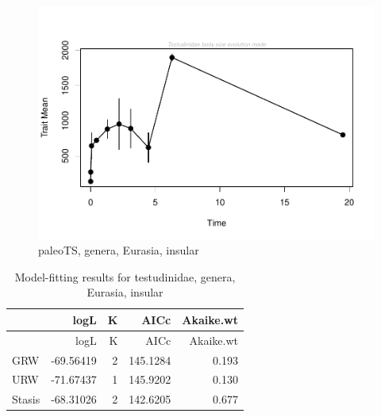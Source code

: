 \newpage

\begin{figure}[H]
	\centering
	\includegraphics{MA_JJ_files/figure-latex/pTSEsI-1.pdf}
	\caption{paleoTS, genera, Eurasia, insular}
	\label{fig:pTSEsI}
\end{figure}

\begin{longtable}[]{@{}lrrrr@{}}
	\caption{Model-fitting results for testudinidae, genera, Eurasia,
		insular}
	\label{tab:pTSEsIEM}\tabularnewline
	\toprule
	& logL & K & AICc & Akaike.wt\tabularnewline
	\midrule
	\endfirsthead
	\toprule
	& logL & K & AICc & Akaike.wt\tabularnewline
	\midrule
	\endhead
	GRW & -69.56419 & 2 & 145.1284 & 0.193\tabularnewline
	URW & -71.67437 & 1 & 145.9202 & 0.130\tabularnewline
	Stasis & -68.31026 & 2 & 142.6205 & 0.677\tabularnewline
	\bottomrule
\end{longtable}


\FloatBarrier